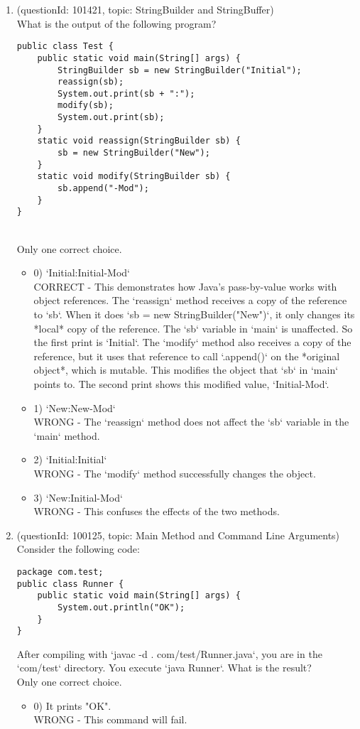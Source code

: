 \documentclass[12pt]{article}
\begin{document}
\begin{enumerate}[label=(\arabic*)]
\begin{itemize}
\end{itemize}
\item (questionId: 101421, topic: StringBuilder and StringBuffer) \\ 
What is the output of the following program?
\begin{verbatim}
public class Test {
    public static void main(String[] args) {
        StringBuilder sb = new StringBuilder("Initial");
        reassign(sb);
        System.out.print(sb + ":");
        modify(sb);
        System.out.print(sb);
    }
    static void reassign(StringBuilder sb) {
        sb = new StringBuilder("New");
    }
    static void modify(StringBuilder sb) {
        sb.append("-Mod");
    }
}
\end{verbatim}
\\ \noindent Only one correct choice. 
\begin{itemize}
\item 0) `Initial:Initial-Mod`
 \\ 
CORRECT - This demonstrates how Java's pass-by-value works with object references. The `reassign` method receives a copy of the reference to `sb`. When it does `sb = new StringBuilder("New")`, it only changes its *local* copy of the reference. The `sb` variable in `main` is unaffected. So the first print is `Initial`. The `modify` method also receives a copy of the reference, but it uses that reference to call `.append()` on the *original object*, which is mutable. This modifies the object that `sb` in `main` points to. The second print shows this modified value, `Initial-Mod`.

\item 1) `New:New-Mod`
 \\ 
WRONG - The `reassign` method does not affect the `sb` variable in the `main` method.

\item 2) `Initial:Initial`
 \\ 
WRONG - The `modify` method successfully changes the object.

\item 3) `New:Initial-Mod`
 \\ 
WRONG - This confuses the effects of the two methods.

\end{itemize}
\item (questionId: 100125, topic: Main Method and Command Line Arguments) \\ 
Consider the following code:
\begin{verbatim}
package com.test;
public class Runner {
    public static void main(String[] args) {
        System.out.println("OK");
    }
}
\end{verbatim}
After compiling with `javac -d . com/test/Runner.java`, you are in the `com/test` directory. You execute `java Runner`. What is the result?
\\ \noindent Only one correct choice. 
\begin{itemize}
\item 0) It prints "OK".
 \\ 
WRONG - This command will fail.


\end{itemize}
\end{enumerate}
\end{document}
